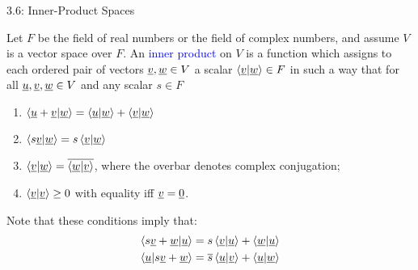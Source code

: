 \documentclass[10pt,letterpaper,english]{beamer}
\begin{document}
\begin{frame}{3.6: Inner-Product Spaces}
\begin{definition} \label{definition:InnerProduct}
Let $F$ be the field of real numbers or the field of complex numbers, and assume $V$ is a vector space over $F$.
An \textcolor{blue}{inner product} on $V$ is a function which assigns to each ordered pair of vectors $\underline{v}, \underline{w} \in V$ a scalar $\left\langle \underline{v} | \underline{w} \right\rangle \in F$ in such a way that for all $\underline{u}, \underline{v}, \underline{w} \in V$ and any scalar $s \in F$
\begin{enumerate}
\item $\left\langle \underline{u} + \underline{v} | \underline{w} \right\rangle
= \left\langle \underline{u} | \underline{w} \right\rangle
+ \left\langle \underline{v} | \underline{w} \right\rangle$
\item $\left\langle s \underline{v} | \underline{w} \right\rangle
= s \left\langle \underline{v} | \underline{w} \right\rangle$
\item $\left\langle \underline{v} | \underline{w} \right\rangle
= \overline{ \left\langle \underline{w} | \underline{v} \right\rangle }$, where the overbar denotes complex conjugation;
\item $\left\langle \underline{v} | \underline{v} \right\rangle \geq 0$ with equality iff $\underline{v} = \underline{0}$.
\end{enumerate}
\end{definition}

\vspace{2mm}
Note that these conditions imply that:
\begin{align*}
\left\langle s \underline{v} + \underline{w} | \underline{u}  \right\rangle
&= s \left\langle \underline{v} | \underline{u} \right\rangle
+ \left\langle \underline{w} | \underline{u} \right\rangle \\
\left\langle \underline{u} | s \underline{v} + \underline{w} \right\rangle
&= \overline{s} \left\langle \underline{u} | \underline{v} \right\rangle
+ \left\langle \underline{u} | \underline{w} \right\rangle
\end{align*}
\end{frame}
\end{document}
